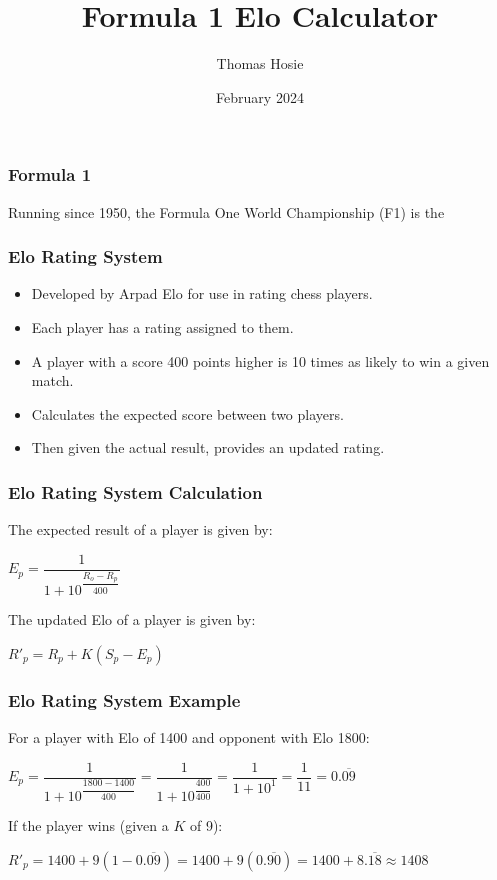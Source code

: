 \documentclass{beamer}
\title{Formula 1 Elo Calculator}
\author{Thomas Hosie}
\date{February 2024}
\begin{document}
\begin{frame}
    \titlepage
\end{frame}

\begin{frame}
    \frametitle{Formula 1}
    Running since 1950, the Formula One World Championship (F1) is the 
\end{frame}

\begin{frame}
    \frametitle{Elo Rating System}
    \begin{itemize}
        \item Developed by Arpad Elo for use in rating chess players.
        \item Each player has a rating assigned to them.
        \item A player with a score 400 points higher is 10 times as likely to win a given match. 
        \item Calculates the expected score between two players.
        \item Then given the actual result, provides an updated rating.
    \end{itemize}
\end{frame}

\begin{frame}
    \frametitle{Elo Rating System Calculation}
    The expected result of a player is given by:
    \begin{center}
        $E_p = \dfrac{1}{1+10^ \dfrac{R_o-R_p}{400}}$
    \end{center}
    The updated Elo of a player is given by:
    \begin{center}
        $R'_p = R_p + K(S_p-E_p)$
    \end{center}
\end{frame}

\begin{frame}
    \frametitle{Elo Rating System Example}
    For a player with Elo of 1400 and opponent with Elo 1800:
    \begin{center}
        $E_p = \dfrac{1}{1+10^ \dfrac{1800-1400}{400}} = \dfrac{1}{1+10^ \dfrac{400}{400}}= \dfrac{1}{1+10^1}= \dfrac{1}{11}= 0.\overline{09}$
    \end{center}
    If the player wins (given a $K$ of 9):
    \begin{center}
        $R'_p = 1400 + 9(1-0.\overline{09})= 1400 + 9(0.\overline{90})= 1400 + 8.\overline{18} \approx 1408$
    \end{center}
\end{frame}
\end{document}
